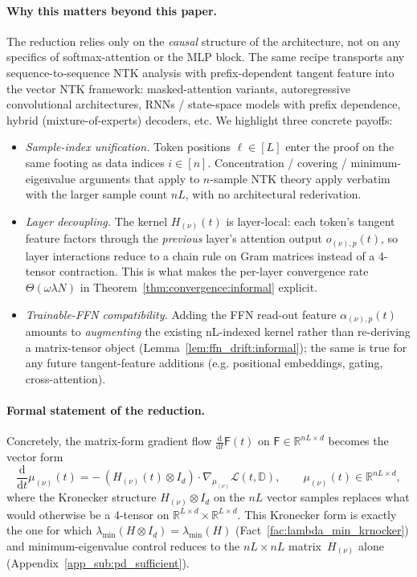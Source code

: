 \documentclass[11pt]{article}
\theoremstyle{plain}
\renewcommand{\d}{\mathrm{d}}
\begin{document}
\paragraph{Why this matters beyond this paper.} The reduction relies only on the {\it causal} structure of the architecture, not on any specifics of softmax-attention or the MLP block. The same recipe transports any sequence-to-sequence NTK analysis with prefix-dependent tangent feature into the vector NTK framework: masked-attention variants, autoregressive convolutional architectures, RNNs / state-space models with prefix dependence, hybrid (mixture-of-experts) decoders, etc. We highlight three concrete payoffs:
\begin{itemize}
    \item[(i)] {\it Sample-index unification.} Token positions $\ell\in[L]$ enter the proof on the same footing as data indices $i\in[n]$. Concentration / covering / minimum-eigenvalue arguments that apply to $n$-sample NTK theory \citep{dzps19, azls19, dllw19, os20} apply verbatim with the larger sample count $nL$, with no architectural rederivation.
    \item[(ii)] {\it Layer decoupling.} The kernel $H_{(\nu)}(t)$ is layer-local: each token's tangent feature factors through the {\it previous} layer's attention output $o_{(\nu),p}(t)$, so layer interactions reduce to a chain rule on Gram matrices instead of a 4-tensor contraction. This is what makes the per-layer convergence rate $\Theta(\omega\lambda N)$ in Theorem~\ref{thm:convergence:informal} explicit.
    \item[(iii)] {\it Trainable-FFN compatibility.} Adding the FFN read-out feature $\alpha_{(\nu),p}(t)$ amounts to {\it augmenting} the existing nL-indexed kernel rather than re-deriving a matrix-tensor object (Lemma~\ref{lem:ffn_drift:informal}); the same is true for any future tangent-feature additions (e.g. positional embeddings, gating, cross-attention).
\end{itemize}

\paragraph{Formal statement of the reduction.} Concretely, the matrix-form gradient flow $\frac{\d}{\d t}\mathsf{F}(t)$ on $\mathsf{F}\in\mathbb{R}^{nL\times d}$ becomes the vector form
\[
\frac{\d}{\d t}\mu_{(\nu)}(t) = -\,(H_{(\nu)}(t)\otimes I_d)\cdot \nabla_{\mu_{(\nu)}}\mathcal{L}(t,\mathbb{D}),\qquad \mu_{(\nu)}(t)\in\mathbb{R}^{nL\times d},
\]
where the Kronecker structure $H_{(\nu)}\otimes I_d$ on the $nL$ vector samples replaces what would otherwise be a 4-tensor on $\mathbb{R}^{L\times d}\times\mathbb{R}^{L\times d}$. This Kronecker form is exactly the one for which $\lambda_{\min}(H\otimes I_d) = \lambda_{\min}(H)$ (Fact~\ref{fac:lambda_min_krnocker}) and minimum-eigenvalue control reduces to the $nL\times nL$ matrix~$H_{(\nu)}$ alone (Appendix~\ref{app_sub:pd_sufficient}).
\end{document}
